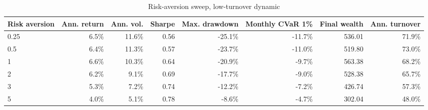 ﻿\begin{table}[H]
\centering
\caption{Risk-aversion sweep, low-turnover dynamic}
\label{tab:allocation-risk-aversion-low-turnover}
\small
\begin{adjustbox}{max width=\linewidth}
\begin{tabular}{lrrrrrrr}
\toprule
Risk aversion & Ann. return & Ann. vol. & Sharpe & Max. drawdown & Monthly CVaR 1\% & Final wealth & Ann. turnover \\
\midrule
0.25 & 6.5\% & 11.6\% & 0.56 & -25.1\% & -11.7\% & 536.01 & 71.9\% \\
0.5 & 6.4\% & 11.3\% & 0.57 & -23.7\% & -11.0\% & 519.80 & 73.0\% \\
1 & 6.6\% & 10.3\% & 0.64 & -20.9\% & -9.7\% & 563.38 & 68.2\% \\
2 & 6.2\% & 9.1\% & 0.69 & -17.7\% & -9.0\% & 528.38 & 65.7\% \\
3 & 5.3\% & 7.2\% & 0.74 & -12.2\% & -7.2\% & 426.74 & 57.3\% \\
5 & 4.0\% & 5.1\% & 0.78 & -8.6\% & -4.7\% & 302.04 & 48.0\% \\
\bottomrule
\end{tabular}
\end{adjustbox}
\end{table}



